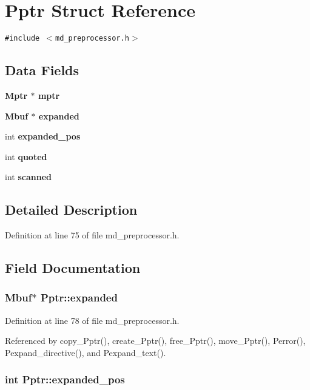\section{Pptr Struct Reference}
\label{structPptr}
{\tt \#include $<$md\_\-preprocessor.h$>$}

\subsection*{Data Fields}
\begin{CompactItemize}
\item 
\bf{Mptr} $\ast$ \bf{mptr}
\item 
\bf{Mbuf} $\ast$ \bf{expanded}
\item 
int \bf{expanded\_\-pos}
\item 
int \bf{quoted}
\item 
int \bf{scanned}
\end{CompactItemize}


\subsection{Detailed Description}




Definition at line 75 of file md\_\-preprocessor.h.

\subsection{Field Documentation}
\subsubsection{\setlength{\rightskip}{0pt plus 5cm}\bf{Mbuf}$\ast$ \bf{Pptr::expanded}}\label{structPptr_bddcba4f437d414b2224b0320f1572d0}




Definition at line 78 of file md\_\-preprocessor.h.

Referenced by copy\_\-Pptr(), create\_\-Pptr(), free\_\-Pptr(), move\_\-Pptr(), Perror(), Pexpand\_\-directive(), and Pexpand\_\-text().
\subsubsection{\setlength{\rightskip}{0pt plus 5cm}int \bf{Pptr::expanded\_\-pos}}\label{structPptr_a9b9ed69324a3f9180a5b20a156f0f0e}




